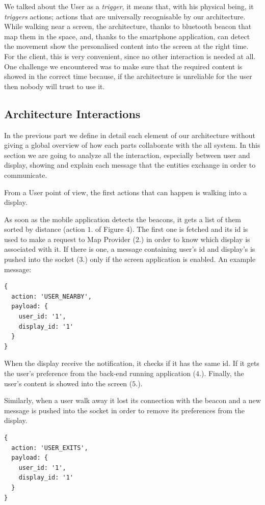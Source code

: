 \documentclass[]{usiinfbachelorproject}
\begin{document}
We talked about the User as a \emph{trigger}, it means that, with his physical being, it \emph{triggers} actions; actions that are universally recognisable by our architecture. While walking near a screen, the architecture, thanks to bluetooth beacon that map them in the space, and, thanks to the smartphone application, can detect the movement show the personalised content into the screen at the right time. For the client, this is very convenient, since no other interaction is needed at all. One challenge we encountered was to make sure that the required content is showed in the correct time because, if the architecture is unreliable for the user then nobody will trust to use it.
 
 
\subsection{Architecture Interactions}

In the previous part we define in detail each element of our architecture without giving a global overview of how each parts collaborate with the all system. In this section we are going to analyze all the interaction, especially between user and display, showing and explain each message that the entities exchange in order to communicate.

From a User point of view, the first actions that can happen is walking into a display.

 As soon as the mobile application detects the beacons, it gets a list of them sorted by distance (action $1.$ of Figure 4). The first one is fetched and its id is used to make a request to Map Provider ($2.$) in order to know which display is associated with it. If there is one, a message containing user's id and display's is pushed into the socket ($3.$) only if the screen application is enabled. An example message:
 
 \begin{lstlisting}
{
  action: 'USER_NEARBY',
  payload: {
    user_id: '1',
    display_id: '1'
  }
}
 \end{lstlisting}
 
When the display receive the notification, it checks if it has the same id. If it gets the user's preference from the back-end running application ($4.$). Finally, the user's content is showed into the screen ($5.$).

Similarly, when a user walk away it lost its connection with the beacon and a new message is pushed into the socket in order to remove its preferences from the display.
 \begin{lstlisting}
{
  action: 'USER_EXITS',
  payload: {
    user_id: '1',
    display_id: '1'
  }
}
 \end{lstlisting}
\end{document}
